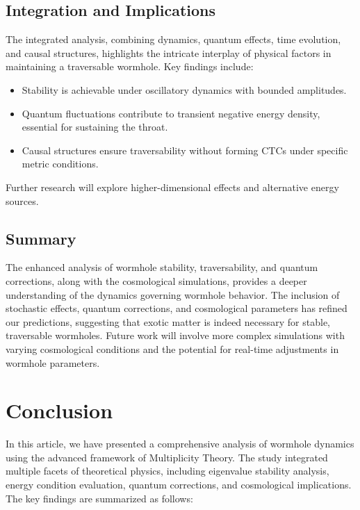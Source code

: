\documentclass{article}
\theoremstyle{plain}
\begin{document}
\subsection{Integration and Implications}
The integrated analysis, combining dynamics, quantum effects, time evolution, and causal structures, highlights the intricate interplay of physical factors in maintaining a traversable wormhole. Key findings include:
\begin{itemize}
    \item Stability is achievable under oscillatory dynamics with bounded amplitudes.
    \item Quantum fluctuations contribute to transient negative energy density, essential for sustaining the throat.
    \item Causal structures ensure traversability without forming CTCs under specific metric conditions.
\end{itemize}
Further research will explore higher-dimensional effects and alternative energy sources.
\subsection{Summary}

The enhanced analysis of wormhole stability, traversability, and quantum corrections, along with the cosmological simulations, provides a deeper understanding of the dynamics governing wormhole behavior. The inclusion of stochastic effects, quantum corrections, and cosmological parameters has refined our predictions, suggesting that exotic matter is indeed necessary for stable, traversable wormholes. Future work will involve more complex simulations with varying cosmological conditions and the potential for real-time adjustments in wormhole parameters.

\section{Conclusion}

In this article, we have presented a comprehensive analysis of wormhole dynamics using the advanced framework of Multiplicity Theory. The study integrated multiple facets of theoretical physics, including eigenvalue stability analysis, energy condition evaluation, quantum corrections, and cosmological implications. The key findings are summarized as follows:
\end{document}
